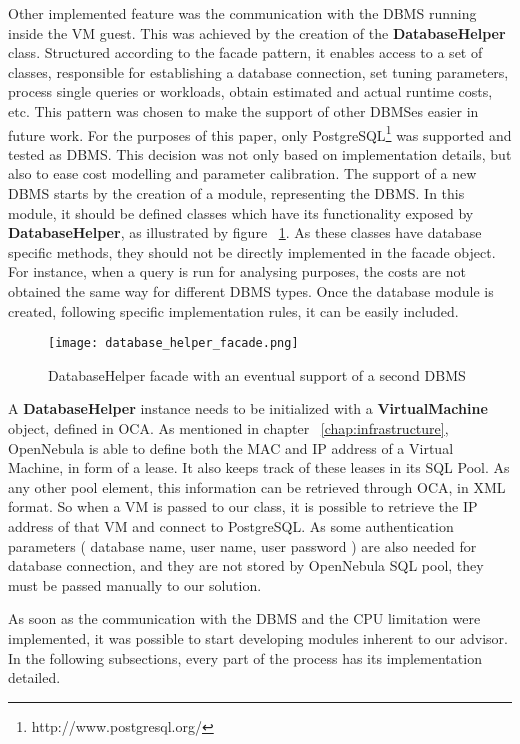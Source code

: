 Other implemented feature was the communication with the DBMS running inside the VM guest. This was achieved by the creation of the \textbf{DatabaseHelper} class. Structured according to the facade pattern, it enables access to a set of classes, responsible for establishing a database connection, set tuning parameters, process single queries or workloads, obtain estimated and actual runtime costs, etc. This pattern was chosen to make the support of other DBMSes easier in future work. For the purposes of this paper, only PostgreSQL\footnote{http://www.postgresql.org/} was supported and tested as DBMS. This decision was not only based on implementation details, but also to ease cost modelling and parameter calibration. The support of a new DBMS starts by the creation of a module, representing the DBMS. In this module,  it should be defined classes which have its functionality exposed by \textbf{DatabaseHelper}, as illustrated by figure ~\ref{fig:facade}. As these classes have database specific methods, 
they should not be 
directly implemented in the facade object. For instance, when a query is run for analysing purposes, the costs are not obtained the same way for different DBMS types. Once the database module is created, following specific implementation rules, it can be easily included. 

\begin{figure}[ht]
  \centering
 \texttt{[image: database\_helper\_facade.png]}
  \caption{DatabaseHelper facade with an eventual support of a second DBMS}
  \label{fig:facade}
\end{figure}

A \textbf{DatabaseHelper} instance needs to be initialized with a \textbf{VirtualMachine} object, defined in OCA. As mentioned in chapter ~\ref{chap:infrastructure}, OpenNebula is able to define both the MAC and IP address of a Virtual Machine, in form of a lease. It also keeps track of these leases in its SQL Pool. As any other pool element, this information can be retrieved through OCA, in XML format. So when a VM is passed to our class, it is possible to retrieve the IP address of that VM and connect to PostgreSQL. As some authentication parameters ( database name, user name, user password ) are also needed for database connection, and they are not stored by OpenNebula SQL pool, they must be passed manually to our solution.

As soon as the communication with the DBMS and the CPU limitation were implemented, it was possible to start developing modules inherent to our advisor. In the following subsections, every part of the process has its implementation detailed.

